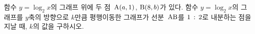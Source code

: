 함수 $y=\log_2 x$의 그래프 위에 두 점~$\mathrm{A}(a{,}\mkern3mu\mathopen{}1)$, $\mathrm{B}(8{,}\mkern3mu\mathopen{}b)$가 있다. 함수 $y=\log_2 x$의 그래프를 $y$축의 방향으로 $k$만큼 평행이동한 그래프가 선분~$\mathrm{AB}$를 $1\mkern3mu :\mkern3mu 2$로 내분하는 점을 지날 때, $k$의 값을 구하시오.
